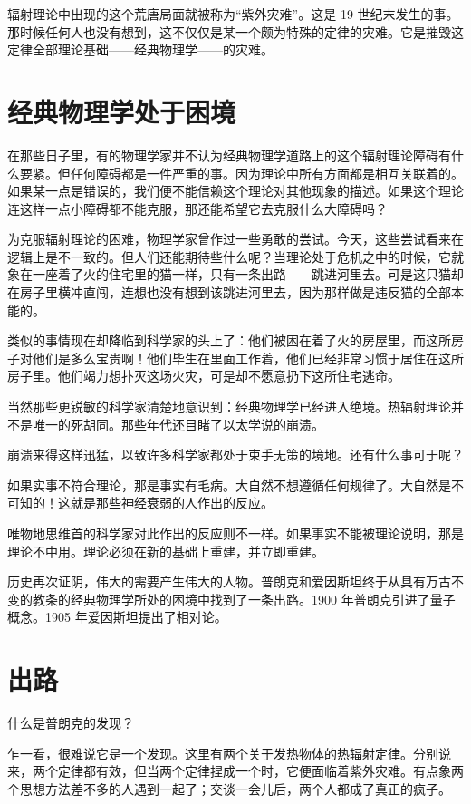 辐射理论中出现的这个荒唐局面就被称为“紫外灾难”。这是 19 世纪末发生的事。那时候任何人也没有想到，这不仅仅是某一个颇为特殊的定律的灾难。它是摧毁这定律全部理论基础——经典物理学——的灾难。

\section{经典物理学处于困境}

在那些日子里，有的物理学家并不认为经典物理学道路上的这个辐射理论障碍有什么要紧。但任何障碍都是一件严重的事。因为理论中所有方面都是相互关联着的。如果某一点是错误的，我们便不能信赖这个理论对其他现象的描述。如果这个理论连这样一点小障碍都不能克服，那还能希望它去克服什么大障碍吗？

为克服辐射理论的困难，物理学家曾作过一些勇敢的尝试。今天，这些尝试看来在逻辑上是不一致的。但人们还能期待些什么呢？当理论处于危机之中的时候，它就象在一座着了火的住宅里的猫一样，只有一条出路——跳进河里去。可是这只猫却在房子里横冲直闯，连想也没有想到该跳进河里去，因为那样做是违反猫的全部本能的。

类似的事情现在却降临到科学家的头上了：他们被困在着了火的房屋里，而这所房子对他们是多么宝贵啊！他们毕生在里面工作着，他们已经非常习惯于居住在这所房子里。他们竭力想扑灭这场火灾，可是却不愿意扔下这所住宅逃命。

当然那些更锐敏的科学家清楚地意识到：经典物理学已经进入绝境。热辐射理论并不是唯一的死胡同。那些年代还目睹了以太学说的崩溃。

崩溃来得这样迅猛，以致许多科学家都处于束手无策的境地。还有什么事可于呢？

如果实事不符合理论，那是事实有毛病。大自然不想遵循任何规律了。大自然是不可知的！这就是那些神经衰弱的人作出的反应。

唯物地思维首的科学家对此作出的反应则不一样。如果事实不能被理论说明，那是理论不中用。理论必须在新的基础上重建，并立即重建。

历史再次证阴，伟大的需要产生伟大的人物。普朗克和爱因斯坦终于从具有万古不变的教条的经典物理学所处的困境中找到了一条出路。1900 年普朗克引进了量子概念。1905 年爱因斯坦提出了相对论。

\section{出路}

什么是普朗克的发现？

乍一看，很难说它是一个发现。这里有两个关于发热物体的热辐射定律。分别说来，两个定律都有效，但当两个定律捏成一个时，它便面临着紫外灾难。有点象两个思想方法差不多的人遇到一起了；交谈一会儿后，两个人都成了真正的疯子。

